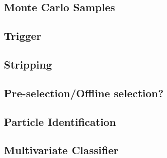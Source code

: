 \subsection{Monte Carlo Samples}
\label{sec:MCsamples}


\subsection{Trigger}
\label{sec:triggerRequirements}

\subsection{Stripping}
\label{sec:stripping}


\subsection{Pre-selection/Offline selection?}
\label{sec:offline_sel}

\subsection{Particle Identification}
\label{sec:PID}

\subsection{Multivariate Classifier}
\label{sec:BDT}
